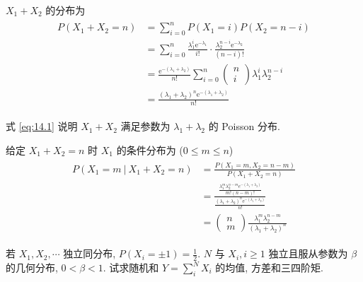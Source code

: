 \documentclass[boxes]{homework}
\begin{document}
\begin{solution}
    $X_1+X_2$ 的分布为
    \begin{align}
        \begin{aligned}
            \label{eq:14.1}
            P\left(X_1+X_2=n\right) &= \sum_{i = 0}^n P(X_1=i)P(X_2=n-i)\\
            &=\sum_{i = 0}^n \frac{\lambda_1^i\mathrm{e}^{-\lambda_1}}{i!}\cdot\frac{\lambda_2^{n-i}\mathrm{e}^{-\lambda_2}}{(n-i)!}\\
            &=\frac{\mathrm{e}^{-(\lambda_1+\lambda_2)}}{n!}\sum_{i=0}^n \begin{pmatrix}
                n\\
                i
            \end{pmatrix}\lambda_1^i\lambda_2^{n-i}\\
            &=\frac{(\lambda_1+\lambda_2)^n\mathrm{e}^{-(\lambda_1+\lambda_2)}}{n!}
        \end{aligned}
    \end{align}

    式 \ref{eq:14.1} 说明 $X_1+X_2$ 满足参数为 $\lambda_1+\lambda_2$ 的 Poisson 分布.

    给定 $X_1+X_2=n$ 时 $X_1$ 的条件分布为 ($0\leq m\leq n$)
    \begin{align}
        \begin{aligned}
            P\left(X_1=m\ \vert\ X_1+X_2=n\right)&=\frac{P\left(X_1=m, X_2=n-m\right)}{P\left(X_1+X_2=n\right)}\\
            &=\frac{\displaystyle\frac{\lambda_1^m\lambda_2^{n-m}e^{-(\lambda_1+\lambda_2)}}{m!(n-m)!}}{\displaystyle\frac{(\lambda_1+\lambda_2)^n\mathrm{e}^{-(\lambda_1+\lambda_2)}}{n!}}\\
            &=\begin{pmatrix}
                n\\
                m
            \end{pmatrix}
            \frac{\lambda_1^m\lambda_2^{n-m}}{(\lambda_1+\lambda_2)^n}
        \end{aligned}
    \end{align}
\end{solution}
\begin{problem}
    若 $X_1, X_2, \cdots$ 独立同分布, $P(X_i=\pm 1)=\displaystyle\frac{1}{2}$. $N$ 与 $X_i, i\geq 1$ 独立且服从参数为 $\beta$ 的几何分布, $0 < \beta < 1$. 试求随机和 $\displaystyle Y=\sum_i^NX_i$ 的均值, 方差和三四阶矩.
\end{problem}
\end{document}
